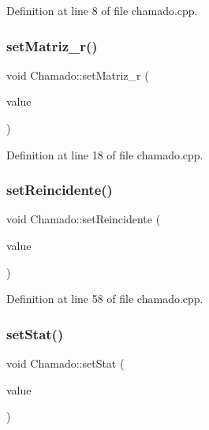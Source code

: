 Definition at line 8 of file chamado.\+cpp.

\hypertarget{class_chamado_a5f8f04ee1b58b3bbb46f8ba6a9c22342}{}\label{class_chamado_a5f8f04ee1b58b3bbb46f8ba6a9c22342} 
\subsubsection{\texorpdfstring{set\+Matriz\+\_\+r()}{setMatriz\_r()}}
{\footnotesize\ttfamily void Chamado\+::set\+Matriz\+\_\+r (\begin{DoxyParamCaption}\item[{const \hyperlink{class_m_raci}{M\+Raci} \&}]{value }\end{DoxyParamCaption})}



Definition at line 18 of file chamado.\+cpp.

\hypertarget{class_chamado_a0abb993bda04f1bd32ed474abf06d0ad}{}\label{class_chamado_a0abb993bda04f1bd32ed474abf06d0ad} 
\subsubsection{\texorpdfstring{set\+Reincidente()}{setReincidente()}}
{\footnotesize\ttfamily void Chamado\+::set\+Reincidente (\begin{DoxyParamCaption}\item[{bool}]{value }\end{DoxyParamCaption})}



Definition at line 58 of file chamado.\+cpp.

\hypertarget{class_chamado_a8a695ce190dcd9acf05e8b7880579fec}{}\label{class_chamado_a8a695ce190dcd9acf05e8b7880579fec} 
\subsubsection{\texorpdfstring{set\+Stat()}{setStat()}}
{\footnotesize\ttfamily void Chamado\+::set\+Stat (\begin{DoxyParamCaption}\item[{const \hyperlink{class_status}{Status} \&}]{value }\end{DoxyParamCaption})}



